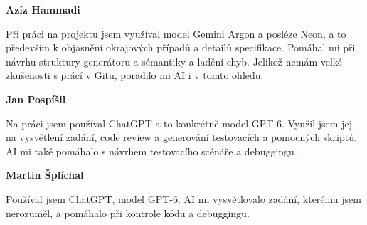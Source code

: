 \documentclass[11pt,a4paper]{article}
\begin{document}
\textbf{Azíz Hammadi}

Při práci na projektu jsem využíval model Gemini Argon a posléze Neon, a to především k objasnění
okrajových případů a detailů specifikace. Pomáhal mi při návrhu struktury generátoru a sémantiky
a ladění chyb. Jelikož nemám velké zkušenosti s prácí v Gitu, poradilo mi AI i v tomto ohledu.

\textbf{Jan Pospíšil}

Na práci jsem používal ChatGPT a to konkrétně model GPT-6. Využil jsem jej
na vysvětlení zadání, code review a generování testovacích a pomocných skriptů. AI mi také pomáhalo s návrhem testovacího scénáře a debuggingu.

\textbf{Martin Šplíchal}

Používal jsem ChatGPT, model GPT-6. AI mi vysvětlovalo zadání, kterému jsem
nerozuměl, a pomáhalo při kontrole kódu a debuggingu.
\end{document}
